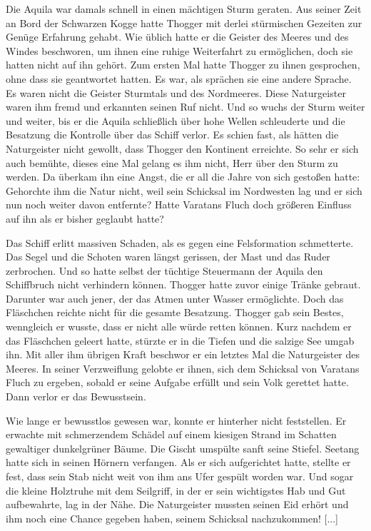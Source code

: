 \documentclass[10pt, a4paper, oneside]{book}
\begin{document}
\begin{multicols}{2}
Die Aquila war damals schnell in einen mächtigen Sturm geraten. Aus seiner Zeit an Bord der Schwarzen Kogge hatte Thogger mit derlei stürmischen Gezeiten zur Genüge Erfahrung gehabt. Wie üblich hatte er die Geister des Meeres und des Windes beschworen, um ihnen eine ruhige Weiterfahrt zu ermöglichen, doch sie hatten nicht auf ihn gehört. Zum ersten Mal hatte Thogger zu ihnen gesprochen, ohne dass sie geantwortet hatten. Es war, als sprächen sie eine andere Sprache. Es waren nicht die Geister Sturmtals und des Nordmeeres. Diese Naturgeister waren ihm fremd und erkannten seinen Ruf nicht. Und so wuchs der Sturm weiter und weiter, bis er die Aquila schließlich über hohe Wellen schleuderte und die Besatzung die Kontrolle über das Schiff verlor. Es schien fast, als hätten die Naturgeister nicht gewollt, dass Thogger den Kontinent erreichte. So sehr er sich auch bemühte, dieses eine Mal gelang es ihm nicht, Herr über den Sturm zu werden. Da überkam ihn eine Angst, die er all die Jahre von sich gestoßen hatte: Gehorchte ihm die Natur nicht, weil sein Schicksal im Nordwesten lag und er sich nun noch weiter davon entfernte? Hatte Varatans Fluch doch größeren Einfluss auf ihn als er bisher geglaubt hatte?\bigskip

Das Schiff erlitt massiven Schaden, als es gegen eine Felsformation schmetterte. Das Segel und die Schoten waren längst gerissen, der Mast und das Ruder zerbrochen. Und so hatte selbst der tüchtige Steuermann der Aquila den Schiffbruch nicht verhindern können. Thogger hatte zuvor einige Tränke gebraut. Darunter war auch jener, der das Atmen unter Wasser ermöglichte. Doch das Fläschchen reichte nicht für die gesamte Besatzung. Thogger gab sein Bestes, wenngleich er wusste, dass er nicht alle würde retten können. Kurz nachdem er das Fläschchen geleert hatte, stürzte er in die Tiefen und die salzige See umgab ihn. Mit aller ihm übrigen Kraft beschwor er ein letztes Mal die Naturgeister des Meeres. In seiner Verzweiflung gelobte er ihnen, sich dem Schicksal von Varatans Fluch zu ergeben, sobald er seine Aufgabe erfüllt und sein Volk gerettet hatte. Dann verlor er das Bewusstsein.\bigskip

Wie lange er bewusstlos gewesen war, konnte er hinterher nicht feststellen. Er erwachte mit schmerzendem Schädel auf einem kiesigen Strand im Schatten gewaltiger dunkelgrüner Bäume. Die Gischt umspülte sanft seine Stiefel. Seetang hatte sich in seinen Hörnern verfangen. Als er sich aufgerichtet hatte, stellte er fest, dass sein Stab nicht weit von ihm ans Ufer gespült worden war. Und sogar die kleine Holztruhe mit dem Seilgriff, in der er sein wichtigstes Hab und Gut aufbewahrte, lag in der Nähe. Die Naturgeister mussten seinen Eid erhört und ihm noch eine Chance gegeben haben, seinem Schicksal nachzukommen! [...]


\end{multicols}
\end{document}

